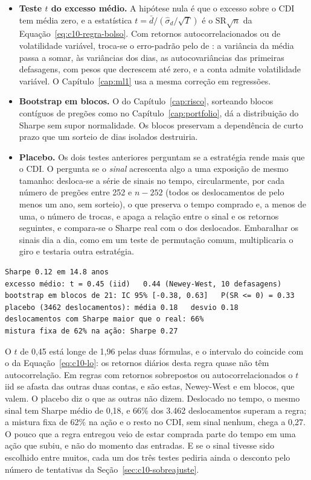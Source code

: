 \begin{itemize}
  \item \textbf{Teste $t$ do excesso médio.} A hipótese nula é que o excesso sobre o CDI tem média zero, e a estatística $t = \bar d/(\hat\sigma_d/\sqrt{T})$ é o $\text{SR}\sqrt{n}$ da Equação~\eqref{eq:c10-regra-bolso}. Com retornos autocorrelacionados ou de volatilidade variável, troca-se o erro-padrão pelo de \citet{newey1987}: a variância da média passa a somar, às variâncias dos dias, as autocovariâncias das primeiras defasagens, com pesos que decrescem até zero, e a conta admite volatilidade variável. O Capítulo~\ref{cap:ml1} usa a mesma correção em regressões.
  \item \textbf{Bootstrap em blocos.} O  do Capítulo~\ref{cap:risco}, sorteando blocos contíguos de pregões como no Capítulo~\ref{cap:portfolio}, dá a distribuição do Sharpe sem supor normalidade. Os blocos preservam a dependência de curto prazo que um sorteio de dias isolados destruiria.
  \item \textbf{Placebo.} Os dois testes anteriores perguntam se a estratégia rende mais que o CDI. O  pergunta se o \emph{sinal} acrescenta algo a uma exposição de mesmo tamanho: desloca-se a série de sinais no tempo, circularmente, por cada número de pregões entre 252 e $n - 252$ (todos os deslocamentos de pelo menos um ano, sem sorteio), o que preserva o tempo comprado e, a menos de uma, o número de trocas, e apaga a relação entre o sinal e os retornos seguintes, e compara-se o Sharpe real com o dos deslocados. Embaralhar os sinais dia a dia, como em um teste de permutação comum, multiplicaria o giro e testaria outra estratégia.
\end{itemize}

\begin{lstlisting}[style=saida]
Sharpe 0.12 em 14.8 anos
excesso médio: t = 0.45 (iid)   0.44 (Newey-West, 10 defasagens)
bootstrap em blocos de 21: IC 95% [-0.38, 0.63]   P(SR <= 0) = 0.33
placebo (3462 deslocamentos): média 0.18   desvio 0.18
deslocamentos com Sharpe maior que o real: 66%
mistura fixa de 62% na ação: Sharpe 0.27
\end{lstlisting}

O $t$ de 0,45 está longe de 1,96 pelas duas fórmulas, e o intervalo do  coincide com o da Equação~\eqref{eq:c10-lo}: os retornos diários desta regra quase não têm autocorrelação. Em regras com retornos sobrepostos ou autocorrelacionados o $t$ iid se afasta das outras duas contas, e são estas, Newey-West e  em blocos, que valem. O placebo diz o que as outras não dizem. Deslocado no tempo, o mesmo sinal tem Sharpe médio de 0,18, e 66\% dos 3.462 deslocamentos superam a regra; a mistura fixa de 62\% na ação e o resto no CDI, sem sinal nenhum, chega a 0,27. O pouco que a regra entregou veio de estar comprada parte do tempo em uma ação que subiu, e não do momento das entradas. E se o sinal tivesse sido escolhido entre muitos, cada um dos três testes pediria ainda o desconto pelo número de tentativas da Seção~\ref{sec:c10-sobreajuste}.

